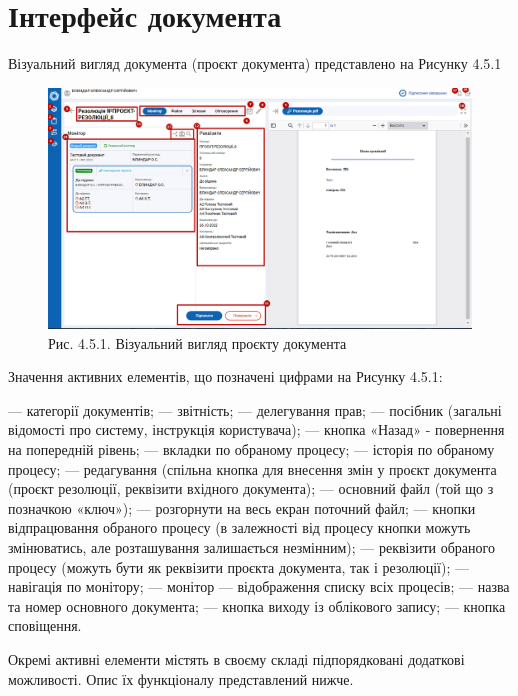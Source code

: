 \section{Інтерфейс документа}

Візуальний вигляд документа (проєкт документа) представлено на Рисунку 4.5.1

\begin{figure}[!htbp]
\centerline{\includegraphics[width=\textwidth]{img/4.5.1.png}}
\caption{Рис. 4.5.1. Візуальний вигляд проєкту документа}
\end{figure}

Значення активних елементів, що позначені цифрами на Рисунку 4.5.1:

 --- категорії документів;
 --- звітність;
 --- делегування прав;
 --- посібник (загальні відомості про систему, інструкція користувача);
 --- кнопка «Назад» - повернення на попередній рівень;
 --- вкладки по обраному процесу;
 --- історія по обраному процесу;
 --- редагування (спільна кнопка для внесення змін у проєкт документа (проєкт резолюції, реквізити вхідного документа);
 --- основний файл (той що з позначкою «ключ»);
 --- розгорнути на весь екран поточний файл;
 --- кнопки відпрацювання обраного процесу (в залежності від процесу кнопки можуть змінюватись, але розташування залишається незмінним);
 --- реквізити обраного процесу (можуть бути як реквізити проєкта документа, так і резолюції);
 --- навігація по монітору;
 --- монітор --- відображення списку всіх процесів;
 --- назва та номер основного документа;
 --- кнопка виходу із облікового запису;
 --- кнопка сповіщення.

Окремі активні елементи містять в своєму складі підпорядковані додаткові
можливості. Опис їх функціоналу представлений нижче.

